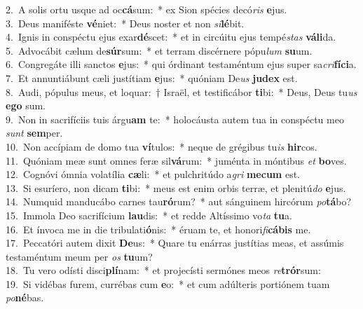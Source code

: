 {2.~}A solis ortu usque ad oc\textbf{cá}sum:~* ex Sion spécies decó\textit{ris} \textbf{e}jus.\\
{3.~}Deus maniféste \textbf{vé}niet:~* Deus noster et non \textit{si}\textbf{lé}bit.\\
{4.~}Ignis in conspéctu ejus exar\textbf{dé}scet:~* et in circúitu ejus tempé\textit{stas} \textbf{vá}\textbf{li}da.\\
{5.~}Advocábit cælum de\textbf{súr}sum:~* et terram discérnere pópu\textit{lum} \textbf{su}um.\\
{6.~}Congregáte illi sanctos \textbf{e}jus:~* qui órdinant testaméntum ejus super sa\textit{cri}\textbf{fí}\textbf{ci}a.\\
{7.~}Et annuntiábunt cæli justítiam \textbf{e}jus:~* quóniam De\textit{us} \textbf{ju}\textbf{dex} est.\\
{8.~}Audi, pópulus meus, et loquar:~† Israël, et testificábor \textbf{ti}bi:~* Deus, Deus tu\textit{us} \textbf{e}\textbf{go} sum.\\
{9.~}Non in sacrifíciis tuis árgu\textbf{am} te:~* holocáusta autem tua in conspéctu meo \textit{sunt} \textbf{sem}per.\\
{10.~}Non accípiam de domo tua \textbf{ví}tulos:~* neque de grégibus tu\textit{is} \textbf{hir}cos.\\
{11.~}Quóniam meæ sunt omnes feræ sil\textbf{vá}rum:~* juménta in móntibus \textit{et} \textbf{bo}ves.\\
{12.~}Cognóvi ómnia volatília \textbf{cæ}li:~* et pulchritúdo a\textit{gri} \textbf{me}\textbf{cum} est.\\
{13.~}Si esuríero, non dicam \textbf{ti}bi:~* meus est enim orbis terræ, et plenitú\textit{do} \textbf{e}jus.\\
{14.~}Numquid manducábo carnes tau\textbf{ró}rum?~* aut sánguinem hircórum \textit{po}\textbf{tá}bo?\\
{15.~}Immola Deo sacrifícium \textbf{lau}dis:~* et redde Altíssimo vo\textit{ta} \textbf{tu}a.\\
{16.~}Et ínvoca me in die tribulati\textbf{ó}nis:~* éruam te, et honori\textit{fi}\textbf{cá}\textbf{bis} me.\\
{17.~}Peccatóri autem dixit \textbf{De}us:~* Quare tu enárras justítias meas, et assúmis testaméntum meum per \textit{os} \textbf{tu}um?\\
{18.~}Tu vero odísti disci\textbf{plí}nam:~* et projecísti sermónes meos \textit{re}\textbf{trór}sum:\\
{19.~}Si vidébas furem, currébas cum \textbf{e}o:~* et cum adúlteris portiónem tuam \textit{po}\textbf{né}bas.\\
